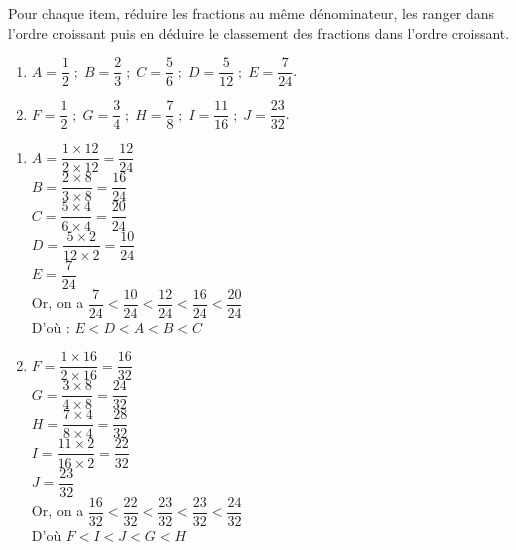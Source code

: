 \begin{exercice*}
   Pour chaque item, réduire les fractions au même dénominateur, les ranger dans l'ordre croissant puis en déduire le classement des fractions dans l'ordre croissant. \\ [-2mm]
   \begin{enumerate}
      \item $A =\dfrac12 \; ; \; B =\dfrac23 \; ; \; C =\dfrac56 \; ; \; D = \dfrac5{12} \; ; \; E =\dfrac7{24}$. \medskip
      \item $F =\dfrac12 \; ; \; G =\dfrac34 \; ; \; H =\dfrac78 \; ; \; I = \dfrac{11}{16} \; ; \; J =\dfrac{23}{32}$.
   \end{enumerate}
 \end{exercice*}
 \begin{corrige}
   \begin{enumerate}
      \item $A =\dfrac{1\times12}{2\times12} =\dfrac{12}{24}$ \\ [2mm]
         $B =\dfrac{2\times8}{3\times8} =\dfrac{16}{24}$ \\ [2mm]
         $C =\dfrac{5\times4}{6\times4} =\dfrac{20}{24}$ \\ [2mm]
         $D = \dfrac{5\times2}{12\times2} =\dfrac{10}{24}$ \\ [2mm]
         $E =\dfrac{7}{24}$ \\ [2mm]
         Or, on a $\dfrac{7}{24}<\dfrac{10}{24}<\dfrac{12}{24}<\dfrac{16}{24}<\dfrac{20}{24}$ \\ [2mm]
         D'où : {\red $E<D<A<B<C$} \\ [2mm]
      \item $F =\dfrac{1\times16}{2\times16} =\dfrac{16}{32}$ \\ [2mm]
         $G =\dfrac{3\times8}{4\times8} =\dfrac{24}{32}$ \\ [2mm]
         $H =\dfrac{7\times4}{8\times4} =\dfrac{28}{32}$ \\ [2mm]
         $I = \dfrac{11\times2}{16\times2} =\dfrac{22}{32}$ \\ [2mm]
         $J =\dfrac{23}{32}$ \\ [2mm]
         Or, on a $\dfrac{16}{32}<\dfrac{22}{32}<\dfrac{23}{32}<\dfrac{23}{32}<\dfrac{24}{32}$ \\ [2mm]
         D'où {\red $F<I<J<G<H$}
   \end{enumerate}
 \end{corrige}